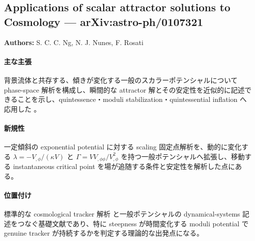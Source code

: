 \subsection{Applications of scalar attractor solutions to Cosmology --- arXiv:astro-ph/0107321}

\textbf{Authors:} S. C. C. Ng, N. J. Nunes, F. Rosati

\paragraph{主な主張}
背景流体と共存する、傾きが変化する一般のスカラーポテンシャルについて phase-space 解析を構成し、瞬間的な attractor 解とその安定性を近似的に記述できることを示し、quintessence・moduli stabilization・quintessential inflation へ応用した \cite{Ng:2001attractor}。

\paragraph{新規性}
一定傾斜の exponential potential に対する scaling 固定点解析を、動的に変化する $\lambda=-V_{,\phi}/(\kappa V)$ と $\Gamma=VV_{,\phi\phi}/V_{,\phi}^{2}$ を持つ一般ポテンシャルへ拡張し、移動する instantaneous critical point を場が追随する条件と安定性を解析した点にある。

\paragraph{位置付け}
標準的な cosmological tracker 解析 \cite{Steinhardt:1998tracking} と一般ポテンシャルの dynamical-systems 記述をつなぐ基礎文献であり、特に steepness が時間変化する moduli potential で genuine tracker が持続するかを判定する理論的な出発点になる。
